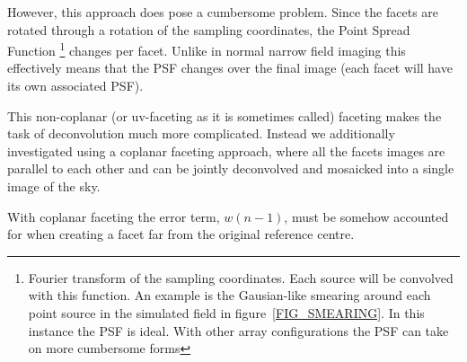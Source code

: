 \documentclass[a4paper,10pt]{article}
\begin{document}
However, this approach does pose a cumbersome problem. Since the facets are rotated through a rotation of the sampling coordinates, 
the Point Spread Function \footnote {Fourier transform of the sampling coordinates. Each source will be convolved with this function.
An example is the Gausian-like smearing around each point source in the simulated field in figure~\ref{FIG_SMEARING}. In this instance
the PSF is ideal. With other array configurations the PSF can take on more cumbersome forms} changes per facet. Unlike in normal 
narrow field imaging this effectively means that the PSF changes over the final image (each facet will have its own associated PSF).

This non-coplanar (or uv-faceting as it is sometimes called) faceting makes the task of deconvolution much more complicated. Instead we 
additionally investigated using a coplanar faceting approach, where all the facets images are parallel to each other and can be jointly 
deconvolved and mosaicked into a single image of the sky.

With coplanar faceting the error term, $w(n-1)$, must be somehow accounted for when creating a facet far from the original reference
centre. 
\pagebreak
{}

\end{document}

